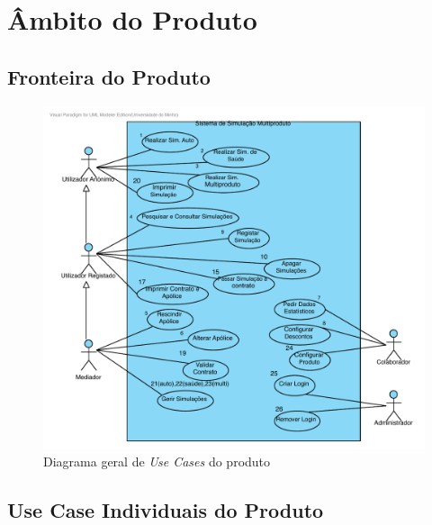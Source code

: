 \section{Âmbito do Produto}
\subsection{Fronteira do Produto}
\begin{figure}[!htb]
	\centering
	\includegraphics[scale=0.85]{images/diagramaGeralDeUseCase}
	\caption {Diagrama geral de \emph{Use Cases} do produto}
\end{figure}

\subsection{Use Case Individuais do Produto}
